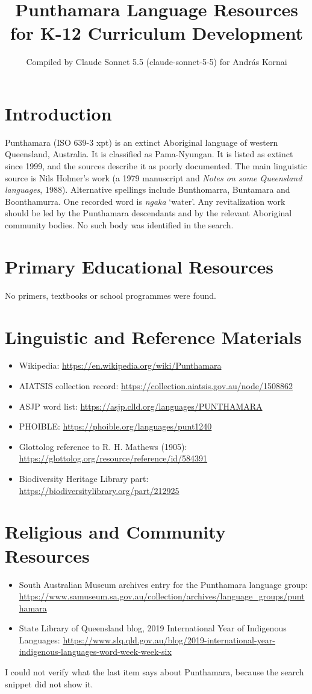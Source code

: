 \documentclass[12pt]{article}
\title{Punthamara Language Resources for K-12 Curriculum Development}
\author{Compiled by Claude Sonnet 5.5 (claude-sonnet-5-5) for Andr\'as Kornai}
\date{}
\begin{document}
\maketitle

\section{Introduction}
Punthamara (ISO 639-3 xpt) is an extinct Aboriginal language of western Queensland, Australia. It is classified as Pama-Nyungan. It is listed as extinct since 1999, and the sources describe it as poorly documented. The main linguistic source is Nils Holmer's work (a 1979 manuscript and \emph{Notes on some Queensland languages}, 1988). Alternative spellings include Bunthomarra, Buntamara and Boonthamurra. One recorded word is \emph{ngaka} `water'. Any revitalization work should be led by the Punthamara descendants and by the relevant Aboriginal community bodies. No such body was identified in the search.

\section{Primary Educational Resources}
No primers, textbooks or school programmes were found.

\section{Linguistic and Reference Materials}
\begin{itemize}
\item Wikipedia: \url{https://en.wikipedia.org/wiki/Punthamara}
\item AIATSIS collection record: \url{https://collection.aiatsis.gov.au/node/1508862}
\item ASJP word list: \url{https://asjp.clld.org/languages/PUNTHAMARA}
\item PHOIBLE: \url{https://phoible.org/languages/punt1240}
\item Glottolog reference to R. H. Mathews (1905): \url{https://glottolog.org/resource/reference/id/584391}
\item Biodiversity Heritage Library part: \url{https://biodiversitylibrary.org/part/212925}
\end{itemize}

\section{Religious and Community Resources}
\begin{itemize}
\item South Australian Museum archives entry for the Punthamara language group: \url{https://www.samuseum.sa.gov.au/collection/archives/language_groups/punthamara}
\item State Library of Queensland blog, 2019 International Year of Indigenous Languages: \url{https://www.slq.qld.gov.au/blog/2019-international-year-indigenous-languages-word-week-week-six}
\end{itemize}
I could not verify what the last item says about Punthamara, because the search snippet did not show it.
\end{document}

